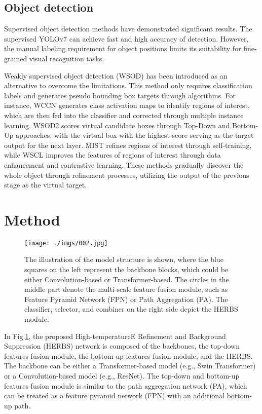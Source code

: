 \documentclass[journal]{IEEEtran}
\begin{document}
\subsection{Object detection}
Supervised object detection methods have demonstrated significant results. The supervised YOLOv7\cite{YOLOv7} can achieve fast and high accuracy of detection. However, the manual labeling requirement for object positions limits its suitability for fine-grained visual recognition tasks.

Weakly supervised object detection (WSOD) has been introduced as an alternative to overcome the limitations. This method only requires classification labels and generates pseudo bounding box targets through algorithms. For instance, WCCN\cite{WCCN} generates class activation maps to identify regions of interest, which are then fed into the classifier and corrected through multiple instance learning. WSOD2\cite{WSOD2} scores virtual candidate boxes through Top-Down and Bottom-Up approaches, with the virtual box with the highest score serving as the target output for the next layer. MIST\cite{MIST} refines regions of interest through self-training, while WSCL\cite{WSCL} improves the features of regions of interest through data enhancement and contrastive learning. These methods gradually discover the whole object through refinement processes, utilizing the output of the previous stage as the virtual target.
\section{Method}

\begin{figure}[t]
    \begin{center}
    \texttt{[image: ./imgs/002.jpg]}
    \end{center}
\caption{The illustration of the model structure is shown, where the blue squares on the left represent the backbone blocks, which could be either Convolution-based or Transformer-based. The circles in the middle part denote the multi-scale feature fusion module, such as Feature Pyramid Network (FPN) or Path Aggregation (PA). The classifier, selector, and combiner on the right side depict the HERBS module.}
\label{fig:HERBS_structure}
\end{figure}

In Fig.\ref{fig:HERBS_structure}, the proposed High-temperatureE Refinement and Background Suppression (HERBS) network is composed of the backbones, the top-down features fusion module, the bottom-up features fusion module, and the HERBS. The backbone can be either a Transformer-based model (e.g., Swin Transformer) or a Convolution-based model (e.g., ResNet). The top-down and bottom-up features fusion module is similar to the path aggregation network (PA)\cite{PANet}, which can be treated as a feature pyramid network (FPN)\cite{FPN} with an additional bottom-up path. 
\end{document}
